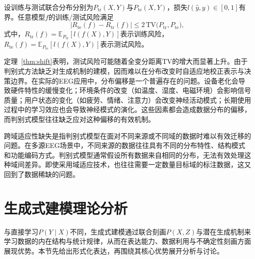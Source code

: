 \begin{theorem}
\label{thm:shift}
设训练与测试联合分布分别为$P_{\text{tr}}(X,Y)$与$P_{\text{te}}(X,Y)$，损失$l(\hat{y},y)\in[0,1]$有界。任意模型$f$的训练/测试风险满足
\begin{equation}
\label{eq:tv-bound}
\big| R_{\text{te}}(f) - R_{\text{tr}}(f) \big| \le 2\,\mathrm{TV}\big(P_{\text{tr}}, P_{\text{te}}\big),
\end{equation}
式中，$R_{\text{tr}}(f)=\mathbb{E}_{P_{\text{tr}}}[l(f(X),Y)]$表示训练风险，$R_{\text{te}}(f)=\mathbb{E}_{P_{\text{te}}}[l(f(X),Y)]$表示测试风险。
\end{theorem}

定理~\ref{thm:shift}表明，测试风险可能随着全变分距离$\mathrm{TV}$的增大而显著上升。由于判别式方法缺乏对生成机制的建模，因而难以在分布改变时自适应地校正表示与决策边界。在实际的EEG应用中，分布偏移是一个普遍存在的问题。设备老化会导致硬件特性的缓慢变化；环境条件的改变（如温度、湿度、电磁环境）会影响信号质量；用户状态的变化（如疲劳、情绪、注意力）会改变神经活动模式；长期使用过程中的学习效应也会导致神经模式的演化。这些因素都会造成数据分布的偏移，而判别式模型往往缺乏应对这种偏移的有效机制。

跨域适应性缺失是指判别式模型在面对不同来源或不同域的数据时难以有效迁移的问题。在多源EEG场景中，不同来源的数据往往具有不同的分布特性、结构模式和功能编码方式。判别式模型通常假设所有数据来自相同的分布，无法有效处理这种域间差异。即使采用域适应技术，也往往需要一定数量目标域的标注数据，这又回到了数据稀缺的问题。


\section{生成式建模理论分析}
与直接学习$P(Y\mid X)$不同，生成式建模通过联合刻画$P(X,Z)$与潜在生成机制来学习数据的内在结构与统计规律，从而在表达能力、数据利用与不确定性刻画方面展现优势。本节先给出形式化表达，再围绕其核心优势展开分析与讨论。

